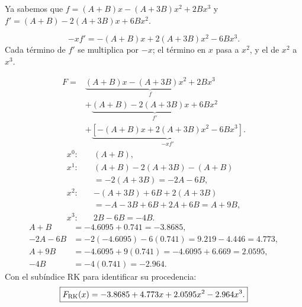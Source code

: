 Ya sabemos que $f=(A+B)x-(A+3B)x^2+2Bx^3$ y $f'=(A+B)-2(A+3B)x+6Bx^2$.

\[
-xf'=-(A+B)x+2(A+3B)x^2-6Bx^3.
\]
Cada término de $f'$ se multiplica por $-x$; el término en $x$ pasa a $x^2$, y el de $x^2$ a $x^3$.

\begin{align*}
F={}&\underbrace{(A+B)x-(A+3B)x^2+2Bx^3}_{f}\\
&+\underbrace{(A+B)-2(A+3B)x+6Bx^2}_{f'}\\
&+\underbrace{[-(A+B)x+2(A+3B)x^2-6Bx^3]}_{-xf'}.
\end{align*}
\begin{align*}
x^0:\quad &(A+B),\\
x^1:\quad &(A+B)-2(A+3B)-(A+B)\\
&=-2(A+3B)=-2A-6B,\\
x^2:\quad &-(A+3B)+6B+2(A+3B)\\
&=-A-3B+6B+2A+6B=A+9B,\\
x^3:\quad &2B-6B=-4B.
\end{align*}
\begin{align*}
A+B&=-4.6095+0.741=-3.8685,\\
-2A-6B&=-2(-4.6095)-6(0.741)=9.219-4.446=4.773,\\
A+9B&=-4.6095+9(0.741)=-4.6095+6.669=2.0595,\\
-4B&=-4(0.741)=-2.964.
\end{align*}
Con el subíndice RK para identificar su procedencia:
\[
\boxed{F_{\mathrm{RK}}(x)=-3.8685+4.773x+2.0595x^2-2.964x^3.}
\]
